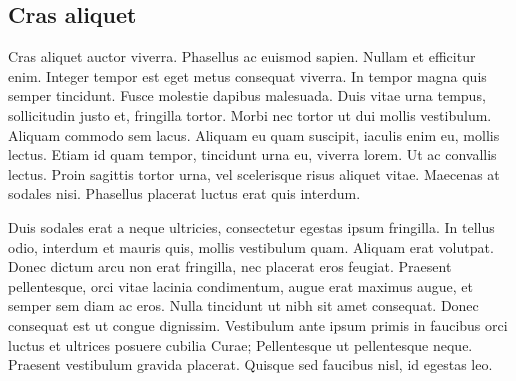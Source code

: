 \subsection{Cras aliquet}
Cras aliquet auctor viverra. Phasellus ac euismod sapien. Nullam et efficitur
enim. Integer tempor est eget metus consequat viverra. In tempor magna quis
semper tincidunt. Fusce molestie dapibus malesuada. Duis vitae urna tempus,
sollicitudin justo et, fringilla tortor. Morbi nec tortor ut dui mollis
vestibulum. Aliquam commodo sem lacus. Aliquam eu quam suscipit, iaculis enim
eu, mollis lectus. Etiam id quam tempor, tincidunt urna eu, viverra lorem. Ut
ac convallis lectus. Proin sagittis tortor urna, vel scelerisque risus aliquet
vitae. Maecenas at sodales nisi. Phasellus placerat luctus erat quis interdum.

Duis sodales erat a neque ultricies, consectetur egestas ipsum fringilla. In
tellus odio, interdum et mauris quis, mollis vestibulum quam. Aliquam erat
volutpat. Donec dictum arcu non erat fringilla, nec placerat eros feugiat.
Praesent pellentesque, orci vitae lacinia condimentum, augue erat maximus
augue, et semper sem diam ac eros. Nulla tincidunt ut nibh sit amet consequat.
Donec consequat est ut congue dignissim. Vestibulum ante ipsum primis in
faucibus orci luctus et ultrices posuere cubilia Curae; Pellentesque ut
pellentesque neque. Praesent vestibulum gravida placerat. Quisque sed faucibus
nisl, id egestas leo.
